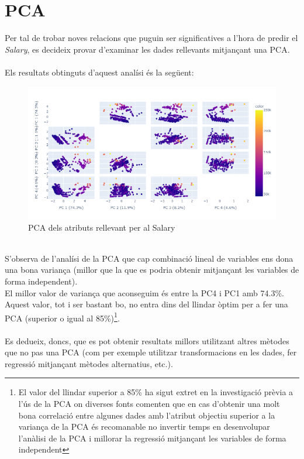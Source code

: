 \documentclass[a4paper, 11pt]{article}
\begin{document}
\section{PCA} \label{PCA}
Per tal de trobar noves relacions que puguin ser significatives a l'hora de predir el \textit{Salary}, es decideix provar d'examinar les dades rellevants mitjançant una PCA.\\\\
Els resultats obtinguts d'aquest analísi és la següent:\\
\begin{figure}[h]
    \centering
    \includegraphics[width=1\textwidth]{pcabona.png}
    \caption{PCA dels atributs rellevant per al Salary}
\end{figure}\\
S'observa de l'analísi de la PCA que cap combinació lineal de variables ens dona una bona variança (millor que la que es podria obtenir mitjançant les variables de forma independent). \\
El millor valor de variança que aconseguim és entre la PC4 i PC1 amb 74.3\%. Aquest valor, tot i ser bastant bo, no entra dins del llindar òptim per a fer una PCA (superior o igual al 85\%)\footnote{El valor del llindar superior a 85\% ha sigut extret en la investigació prèvia a l'ús de la PCA on diverses fonts comenten que en cas d'obtenir una molt bona correlació entre algunes dades amb l'atribut objectiu superior a la variança de la PCA és recomanable no invertir temps en desenvolupar  l'anàlisi de la PCA i millorar la regressió mitjançant les variables de forma independent}.\\\\
Es dedueix, doncs, que es pot obtenir resultats millors utilitzant altres mètodes que no pas una PCA (com per exemple utilitzar transformacions en les dades, fer regressió mitjançant mètodes alternatius, etc.).
\newpage
\end{document}
